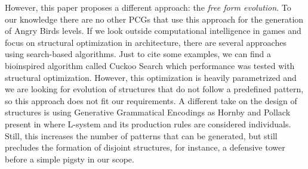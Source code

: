 \documentclass[runningheads,a4paper]{llncs}
\begin{document}
However, this paper proposes a different approach: the \textit{free
form evolution}. To our knowledge there are no other PCGs that
use this approach for the generation of Angry Birds levels. 
If we look outside computational intelligence in games and focus on 
structural optimization in architecture, there are several approaches using search-based
algorithms. Just to cite some examples, we can find a bioinspired algorithm called Cuckoo Search \cite{gandomi2013cuckoo}
which performance was tested with structural optimization. However, this optimization is heavily parametrized
and we are looking for evolution of structures that do not follow a predefined pattern, so this approach does not fit our requirements. A different take on the design of structures is using Generative Grammatical 
Encodings as Hornby and Pollack present in \cite{hornby2001advantages} where L-system
and its production rules are considered individuals. Still, this increases the
number of patterns that can be generated, but still precludes the formation 
of disjoint structures, for instance, a defensive tower before a simple pigsty in our scope.

\end{document}
